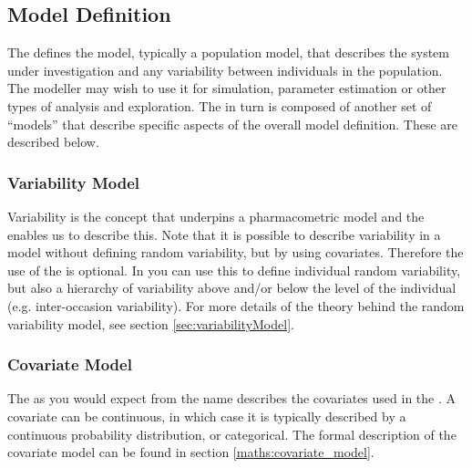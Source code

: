 

\subsection{Model Definition}

The  defines the model, typically a population
model, that describes the system under investigation and any variability
between individuals in the population. The modeller may wish to use
it for simulation, parameter estimation or other types of analysis and
exploration. The  in turn is composed of another
set of ``models'' that describe specific aspects of the overall model
definition. These are described below.

\subsubsection{Variability Model}
\label{sec:variability_model}

Variability is the concept that underpins a pharmacometric model and
the  enables us to describe this. Note that it
is possible to describe variability in a \pharmml model without
defining random variability, but by using covariates.
Therefore the use of the 
is optional. In \pharmml you can use this to define
individual random variability, but also a hierarchy of variability
above and/or below the level of the individual (e.g.\xspace inter-occasion
variability). For more details of the theory behind the random
variability model, see section \ref{sec:variabilityModel}.


\subsubsection{Covariate Model}

The  as you would expect from the name describes the
covariates used in the . A covariate can be
continuous, in which case it is typically described by a continuous probability
distribution, or categorical. The formal description of the covariate
model can be found in section \ref{maths:covariate_model}.

